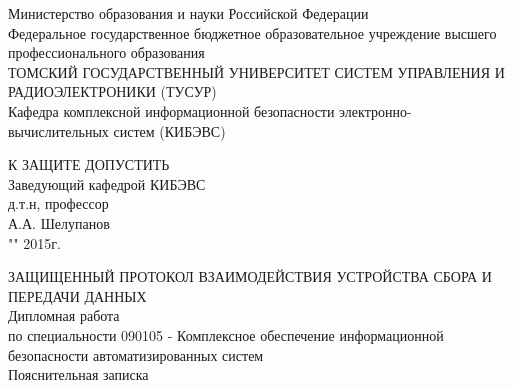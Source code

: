\newpage
{}

\begin{center}
Министерство образования и науки Российской Федерации\\
Федеральное государственное бюджетное образовательное учреждение высшего профессионального образования\\
ТОМСКИЙ ГОСУДАРСТВЕННЫЙ УНИВЕРСИТЕТ СИСТЕМ УПРАВЛЕНИЯ И РАДИОЭЛЕКТРОНИКИ (ТУСУР)\\
Кафедра комплексной информационной безопасности электронно-вычислительных систем (КИБЭВС)\\
\end{center}

\hfill
\begin{minipage}[right]{0.4\linewidth}
\begin{singlespace}
 К ЗАЩИТЕ ДОПУСТИТЬ \\
 Заведующий кафедрой КИБЭВС \\
 д.т.н, профессор \\
 \underline{\hspace{2.5cm}}А.А. Шелупанов \\
 "\underline{\hspace{1cm}}"\underline{\hspace{3cm}} 2015г.\\
\end{singlespace} 
\end{minipage}


\begin{center}
ЗАЩИЩЕННЫЙ ПРОТОКОЛ ВЗАИМОДЕЙСТВИЯ УСТРОЙСТВА СБОРА И ПЕРЕДАЧИ ДАННЫХ \\
Дипломная работа \\
по специальности 090105 - Комплексное обеспечение информационной безопасности автоматизированных систем \\
\vspace{0.5cm}
Пояснительная записка
\vspace{1cm}
\end{center}


